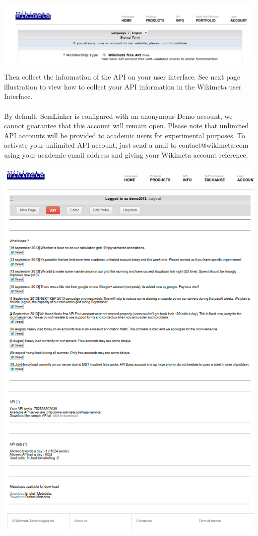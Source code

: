 \documentclass[11pt]{article}
\newcommand{\seml}{SemLinker}
\begin{document}
\begin{center}
  \includegraphics[width=\textwidth]{wikimeta_account}\\
\end{center}

\noindent Then collect the information of the API on your user interface. 
See next page illustration to view how to collect your API information in the Wikimeta user Interface. \\
\\
By default, \seml{} is configured with an anonymous Demo account, we cannot guarantee that this account will remain open. 
Please note that unlimited API accounts will be provided to academic users for experimental purposes. 
To activate your unlimited API account, just send a mail to contact@wikimeta.com using your academic email address and giving your Wikimeta account reference. 


\begin{center}
  \includegraphics[width=\textwidth]{wikimeta_api}\\
\end{center}
\end{document}
